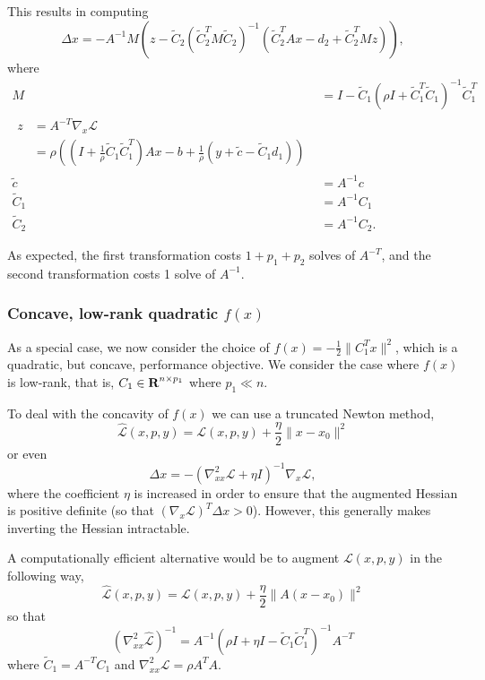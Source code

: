 \documentclass{article}
\newcommand{\inv}[1]{\frac{1}{#1}}
\newcommand{\tC}{\tilde{C}}
\begin{document}
This results in computing
    \begin{equation}
    \Delta x = -A^{-1} M (z - 
        \tC_2 (\tC_2^T M \tC_2)^{-1}(\tC_2^T Ax - d_2 + \tC_2^T Mz)),
    \end{equation}
    where 
    \begin{subequations}\begin{align}
    M &= I - \tC_1(\rho I + \tC_1^T\tC_1)^{-1}\tC_1^T \\
    \begin{split}
    z &= A^{-T} \nabla_x \mathcal{L} \\
      &= \rho((I + \inv{\rho}\tC_1\tC_1^T)Ax
        - b + \inv{\rho}(y +\tilde{c} - \tC_1 d_1))
    \end{split} \\
    \tilde{c} &= A^{-1} c \\
    \tC_1 &= A^{-1} C_1 \\
    \tC_2 &= A^{-1} C_2. 
    \end{align}\end{subequations}

As expected, the first transformation costs $1 + p_1 + p_2$ solves of $A^{-T}$,
    and the second transformation costs 1 solve of $A^{-1}$.

\subsubsection{Concave, low-rank quadratic $f(x)$}
As a special case, we now consider the choice of 
    $f(x) = - \frac{1}{2}\|C_1^T x \|^2$,
    which is a quadratic, but concave, performance objective.
We consider the case where $f(x)$ is low-rank, that is,
    $C_1 \in {\mbox{\bf R}}^{n \times p_1}$ where $p_1 \ll n$.

To deal with the concavity of $f(x)$ we can use a truncated Newton method,
    \begin{equation}
    \hat{\mathcal{L}}(x,p,y) = \mathcal{L}(x,p,y) + \frac{\eta}{2} \|x - x_0\|^2
    \end{equation}
    or even
    \begin{equation}
    \Delta x = -(\nabla_{xx}^2 \mathcal{L} + \eta I)^{-1}
        \nabla_x \mathcal{L},
    \end{equation}
    where the coefficient $\eta$ is increased in order to 
    ensure that the augmented Hessian is positive definite 
    (so that $(\nabla_x\mathcal{L})^T\Delta x > 0$).
However, this generally makes inverting the Hessian intractable.

A computationally efficient alternative would be to augment $\mathcal{L}(x,p,y)$
    in the following way,
    \begin{equation}
    \hat{\mathcal{L}}(x,p,y) = \mathcal{L}(x,p,y) + 
        \frac{\eta}{2} \|A(x - x_0)\|^2
    \end{equation}
    so that
    \begin{equation}
    (\nabla_{xx}^2 \hat{\mathcal{L}})^{-1} = 
        A^{-1} (\rho I + \eta I - \tC_1 \tC_1^T)^{-1} A^{-T}
    \end{equation}
    where $\tC_1 = A^{-T} C_1$ and $\nabla_{xx}^2 \mathcal{L} = \rho A^T A$.
\end{document}
